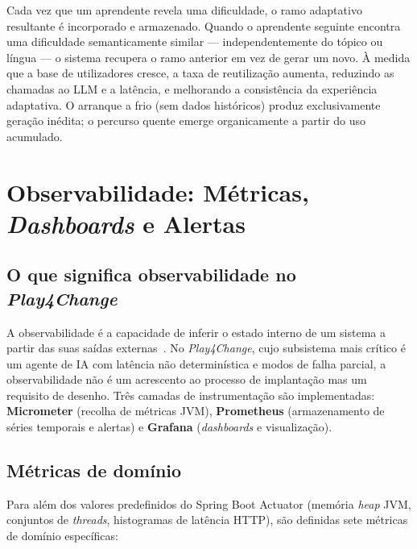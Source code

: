Cada vez que um aprendente revela uma dificuldade, o ramo adaptativo
resultante é incorporado e armazenado.
Quando o aprendente seguinte encontra uma dificuldade semanticamente
similar — independentemente do tópico ou língua — o sistema recupera o
ramo anterior em vez de gerar um novo.
À medida que a base de utilizadores cresce, a taxa de reutilização aumenta,
reduzindo as chamadas ao LLM e a latência, e melhorando a consistência da
experiência adaptativa.
O arranque a frio (sem dados históricos) produz exclusivamente geração
inédita; o percurso quente emerge organicamente a partir do uso acumulado.

\section{Observabilidade: Métricas, \textit{Dashboards} e Alertas}
\label{sec:observabilidade_deepdive}

\subsection*{O que significa observabilidade no \textit{Play4Change}}

A observabilidade é a capacidade de inferir o estado interno de um sistema
a partir das suas saídas externas~\cite{humble2018accelerate}.
No \textit{Play4Change}, cujo subsistema mais crítico é um agente de IA
com latência não determinística e modos de falha parcial, a observabilidade
não é um acrescento ao processo de implantação mas um requisito de desenho.
Três camadas de instrumentação são implementadas: \textbf{Micrometer}
(recolha de métricas JVM), \textbf{Prometheus} (armazenamento de séries
temporais e alertas) e \textbf{Grafana} (\textit{dashboards} e
visualização).

\subsection*{Métricas de domínio}

Para além dos valores predefinidos do Spring Boot Actuator (memória
\textit{heap} JVM, conjuntos de \textit{threads}, histogramas de latência
HTTP), são definidas sete métricas de domínio específicas:

